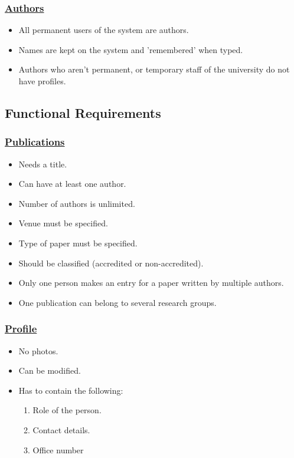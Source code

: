 \documentclass[a4paper,12pt]{article}
\begin{document}
\subsubsection{\underline{Authors}}
\begin{itemize}
\item All permanent users of the system are authors.
\item Names are kept on the system and 'remembered' when typed.
\item Authors who aren't permanent, or temporary staff of the university do not have profiles. 
\end{itemize}

\subsection{Functional Requirements}
\subsubsection{\underline{Publications}}
\begin{itemize}
\item Needs a title.
\item Can have at least one author.
\item Number of authors is unlimited.
\item Venue must be specified.
\item Type of paper must be specified.
\item Should be classified (accredited or non-accredited).
\item Only one person makes an entry for a paper written by multiple authors.
\item One publication can belong to several research groups.
\end{itemize}

\subsubsection{\underline{Profile}}
\begin{itemize}
\item No photos.
\item Can be modified.
\item Has to contain the following:
\begin{enumerate}
\item Role of the person.
\item Contact details.
\item Office number
\end{enumerate}
\end{itemize}
\end{document}
